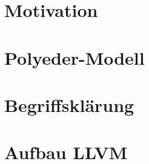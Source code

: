 \documentclass[a4paper, ngerman]{scrreprt}
\begin{document}

\tableofcontents

\chapter{Motivation}


\chapter{Polyeder-Modell}


\chapter{Begriffsklärung}


\chapter{Aufbau LLVM}

\end{document}
